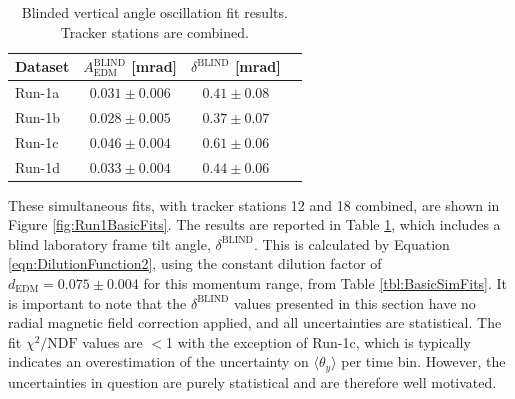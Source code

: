\begin{table}[h!]
\centering{}
\begin{tabular}{l|ccc}
\hline
\hline
Dataset & $A_{\text{EDM}}^{\text{BLIND}}$ [mrad] & $\delta^{\text{BLIND}}$ [mrad] \\ %
\hline
Run-1a  & $0.031\pm0.006$ & $0.41\pm0.08$ \\%
Run-1b  & $0.028\pm0.005$ & $0.37\pm0.07$ \\ %
Run-1c  & $0.046\pm0.004$ & $0.61\pm0.06$ \\ %
Run-1d  & $0.033\pm0.004$ & $0.44\pm0.06$ \\ %
\hline
\hline
\end{tabular}
\caption{Blinded vertical angle oscillation fit results. Tracker stations are combined.} 
\label{tbl:Run1BasicFits}
\end{table}

\clearpage

These simultaneous fits, with tracker stations 12 and 18 combined, are shown in Figure \ref{fig:Run1BasicFits}. The results are reported in Table \ref{tbl:Run1BasicFits}, which includes a blind laboratory frame tilt angle, $\delta^{\text{BLIND}}$. This is calculated by Equation \ref{eqn:DilutionFunction2}, using the constant dilution factor of $d_{\text{EDM}}=0.075\pm0.004$ for this momentum range, from Table \ref{tbl:BasicSimFits}. It is important to note that the $\delta^{\text{BLIND}}$ values presented in this section have no radial magnetic field correction applied, and all uncertainties are statistical. The fit $\chi^{2}/\text{NDF}$ values are $<$1 with the exception of Run-1c, which is typically indicates an overestimation of the uncertainty on $\langle\theta_{y}\rangle$ per time bin. However, the uncertainties in question are purely statistical and are therefore well motivated. 







